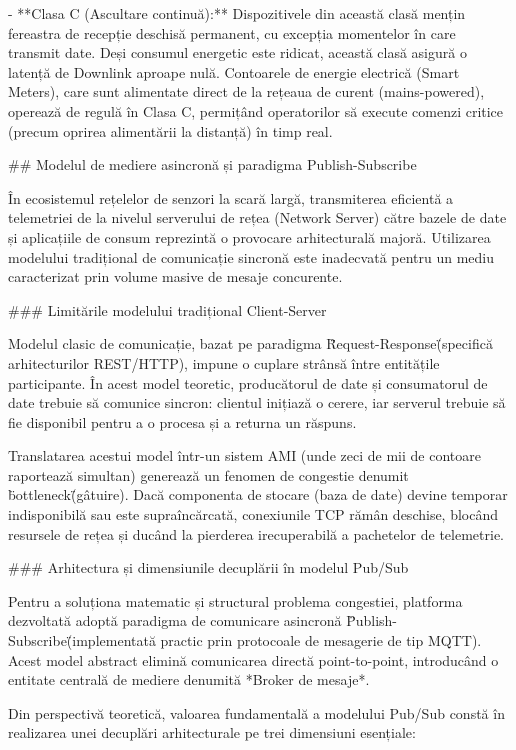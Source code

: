 - **Clasa C (Ascultare continuă):** Dispozitivele din această clasă
  mențin fereastra de recepție deschisă permanent, cu excepția
  momentelor în care transmit date. Deși consumul energetic este
  ridicat, această clasă asigură o latență de Downlink aproape nulă.
  Contoarele de energie electrică (Smart Meters), care sunt alimentate
  direct de la rețeaua de curent (mains-powered), operează de regulă în
  Clasa C, permițând operatorilor să execute comenzi critice (precum
  oprirea alimentării la distanță) în timp real.

## Modelul de mediere asincronă și paradigma Publish-Subscribe

În ecosistemul rețelelor de senzori la scară largă, transmiterea
eficientă a telemetriei de la nivelul serverului de rețea (Network
Server) către bazele de date și aplicațiile de consum reprezintă o
provocare arhitecturală majoră. Utilizarea modelului tradițional de
comunicație sincronă este inadecvată pentru un mediu caracterizat prin
volume masive de mesaje concurente.

### Limitările modelului tradițional Client-Server

Modelul clasic de comunicație, bazat pe paradigma \"Request-Response\"
(specifică arhitecturilor REST/HTTP), impune o cuplare strânsă între
entitățile participante. În acest model teoretic, producătorul de date
și consumatorul de date trebuie să comunice sincron: clientul inițiază o
cerere, iar serverul trebuie să fie disponibil pentru a o procesa și a
returna un răspuns.

Translatarea acestui model într-un sistem AMI (unde zeci de mii de
contoare raportează simultan) generează un fenomen de congestie denumit
\"bottleneck\" (gâtuire). Dacă componenta de stocare (baza de date)
devine temporar indisponibilă sau este supraîncărcată, conexiunile TCP
rămân deschise, blocând resursele de rețea și ducând la pierderea
irecuperabilă a pachetelor de telemetrie.

### Arhitectura și dimensiunile decuplării în modelul Pub/Sub

Pentru a soluționa matematic și structural problema congestiei,
platforma dezvoltată adoptă paradigma de comunicare asincronă
\"Publish-Subscribe\" (implementată practic prin protocoale de mesagerie
de tip MQTT). Acest model abstract elimină comunicarea directă
point-to-point, introducând o entitate centrală de mediere denumită
*Broker de mesaje*.

Din perspectivă teoretică, valoarea fundamentală a modelului Pub/Sub
constă în realizarea unei decuplări arhitecturale pe trei dimensiuni
esențiale:

